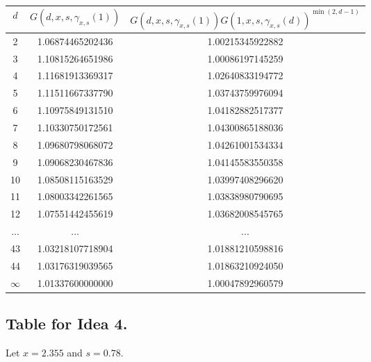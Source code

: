 \documentclass[12pt,a4paper]{amsart}
\numberwithin{equation}{section}
\theoremstyle{plain}
\theoremstyle{definition}
\newcommand{\1}{\textbf{1}}
\begin{document}
\begin{table}[!h]
\begin{center}
\begin{tabular}{|c|c|c|} \hline
$d$ & $G(d,x,s,\gamma_{x,s}(1))$ & $G(d,x,s,\gamma_{x,s}(1))G(1,x,s,\gamma_{x,s}(d))^{\min(2,d-1)}$ \\ \hline
2 & 1.06874465202436  & 1.00215345922882 \\ \hline
3 & 1.10815264651986 &  1.00086197145259 \\ \hline
4 & 1.11681913369317 & 1.02640833194772 \\ \hline
5 & 1.11511667337790 &1.03743759976094 \\ \hline
6 &1.10975849131510 &1.04182882517377 \\ \hline
7 &1.10330750172561 &1.04300865188036 \\ \hline
8 & 1.09680798068072 &1.04261001534334 \\ \hline
9 & 1.09068230467836 &1.04145583550358 \\ \hline
10 & 1.08508115163529 &1.03997408296620 \\ \hline
11 & 1.08003342261565 &1.03838980790695 \\ \hline
12 & 1.07551442455619 &1.03682008545765 \\ \hline
... &   ... & ... \\ \hline
43 & 1.03218107718904 & 1.01881210598816 \\ \hline
44 &1.03176319039565 & 1.01863210924050 \\ \hline
$\infty$ & 1.01337600000000 &1.00047892960579 \\ \hline
\end{tabular}
\caption{}
\end{center}
\end{table}

\newpage

\subsection{Table for Idea 4.}

Let $x=2.355$ and $s=0.78$.
\end{document}
